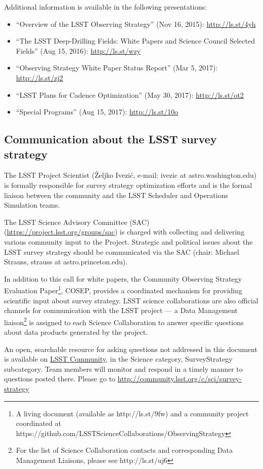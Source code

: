 \documentclass[DM,lsstdraft,toc,usenatbib]{lsstdoc}
\begin{document}
Additional information is available in the following presentations:
\begin{itemize}
\item ``Overview of the LSST Observing Strategy'' (Nov 16, 2015): \url{http://ls.st/4yh}
\item ``The LSST Deep-Drilling Fields: White Papers and Science Council Selected Fields'' (Aug 15, 2016): \url{http://ls.st/wzy}
\item ``Observing Strategy White Paper Status Report'' (Mar 5, 2017): \url{http://ls.st/zj2}
\item ``LSST Plans for Cadence Optimization'' (May 30, 2017): \url{http://ls.st/ot2}
\item ``Special Programs'' (Aug 15, 2017): \url{http://ls.st/10o}
\end{itemize}


\subsection{Communication about the LSST survey strategy} 

The LSST Project Scientist (\v{Z}eljko Ivezi\'{c}, e-mail: ivezic at astro.washington.edu) is formally responsible for survey strategy optimization efforts and is the formal liaison between the community and the LSST Scheduler and Operations Simulation teams.

The LSST Science Advisory Committee (SAC) (\url{https://project.lsst.org/groups/sac}) is charged with collecting and delivering various community input to the Project. Strategic and political issues about the LSST survey strategy should be communicated via the SAC (chair: Michael Strauss, strauss at astro.princeton.edu).

In addition to this call for white papers, the Community Observing Strategy Evaluation Paper\footnote{A living document (available
as http://ls.st/9fw) and a community project coordinated at https://github.com/LSSTScienceCollaborations/ObservingStrategy}, COSEP, provides a coordinated mechanism for providing scientific input about survey strategy. LSST science collaborations are also official channels for communication with the LSST project --- a Data Management 
liaison\footnote{For the list of Science Collaboration contacts and corresponding Data Management Liaisons, please see http://ls.st/uj6}  is assigned to each Science Collaboration to answer specific questions about data products generated by the project.

An open, searchable resource for asking questions not addressed in this document is available on \href{http://community.lsst.org}{LSST Community}, in the Science category, SurveyStrategy subcategory. Team members will monitor and respond in a timely manner to questions posted there. Please go to \url{http://community.lsst.org/c/sci/survey-strategy}
\end{document}
